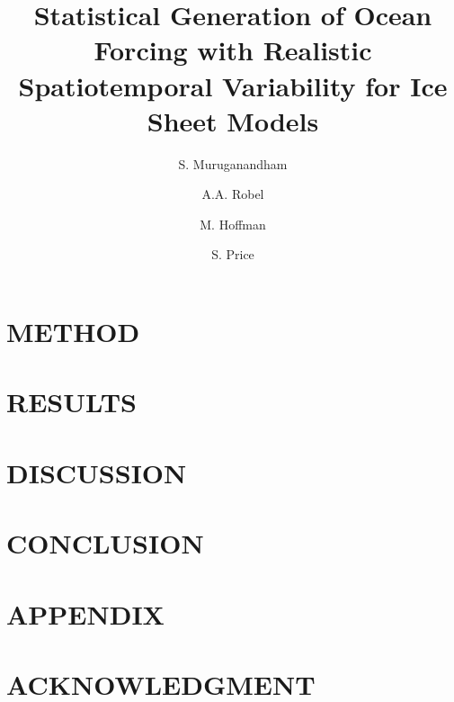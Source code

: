 \documentclass{IEEEcsmag}
\begin{document}

\title{Statistical Generation of Ocean Forcing with Realistic Spatiotemporal Variability for Ice Sheet Models}

\author{S. Muruganandham}
\author{A.A. Robel}
\author{M. Hoffman}
\author{S. Price}


\maketitle

\section{METHOD}

\section{RESULTS}

\section{DISCUSSION}

\section{CONCLUSION}

\section{APPENDIX}

\section{ACKNOWLEDGMENT}



\end{document}
